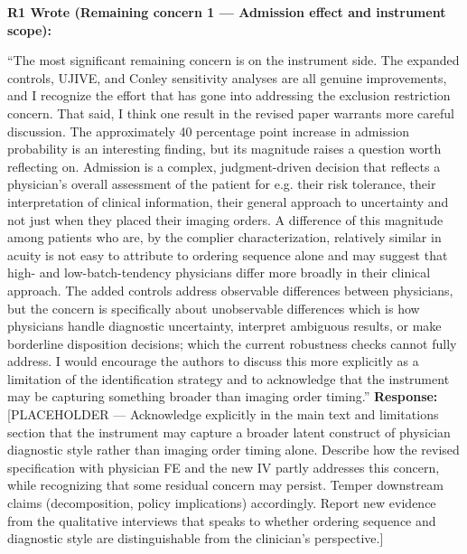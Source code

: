 \documentclass[11pt]{article}
\newenvironment{quote2}
{ \bigskip
\noindent
         \small\em
         \baselineskip=14pt
}
\newcommand{\1}{\hbox{\rm 1\kern-.35em 1}}
\begin{document}
\begin{quote2}
\textbf{R1 Wrote (Remaining concern 1 --- Admission effect and instrument scope):}

\noindent ``The most significant remaining concern is on the instrument side. The expanded controls, UJIVE, and Conley sensitivity analyses are all genuine improvements, and I recognize the effort that has gone into addressing the exclusion restriction concern. That said, I think one result in the revised paper warrants more careful discussion. The approximately 40 percentage point increase in admission probability is an interesting finding, but its magnitude raises a question worth reflecting on. Admission is a complex, judgment-driven decision that reflects a physician's overall assessment of the patient for e.g. their risk tolerance, their interpretation of clinical information, their general approach to uncertainty and not just when they placed their imaging orders. A difference of this magnitude among patients who are, by the complier characterization, relatively similar in acuity is not easy to attribute to ordering sequence alone and may suggest that high- and low-batch-tendency physicians differ more broadly in their clinical approach. The added controls address observable differences between physicians, but the concern is specifically about unobservable differences which is how physicians handle diagnostic uncertainty, interpret ambiguous results, or make borderline disposition decisions; which the current robustness checks cannot fully address. I would encourage the authors to discuss this more explicitly as a limitation of the identification strategy and to acknowledge that the instrument may be capturing something broader than imaging order timing.''
\end{quote2}

\noindent\textbf{Response:} \color{blue}[PLACEHOLDER --- Acknowledge explicitly in the main text and limitations section that the instrument may capture a broader latent construct of physician diagnostic style rather than imaging order timing alone. Describe how the revised specification with physician FE and the new IV partly addresses this concern, while recognizing that some residual concern may persist. Temper downstream claims (decomposition, policy implications) accordingly. Report new evidence from the qualitative interviews that speaks to whether ordering sequence and diagnostic style are distinguishable from the clinician's perspective.]
\end{document}
